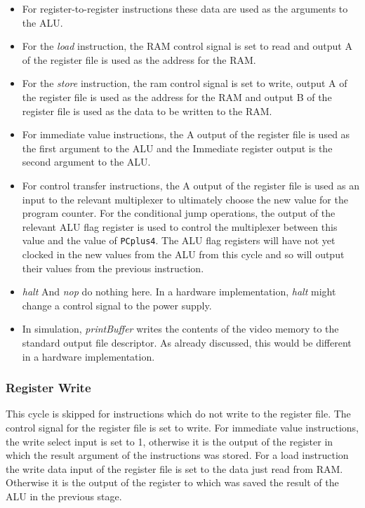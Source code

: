 \documentclass[11pt,a4paper]{IEEEtran}
\begin{document}
				\begin{itemize}
					\item For register-to-register instructions these data are used as the arguments to the ALU.
					\item For the \textit{load} instruction, the RAM control signal is set to read and output A of the register file is used as the address for the RAM.
					\item For the \textit{store} instruction, the ram control signal is set to write, output A of the register file is used as the address for the RAM and output B of the register file is used as the data to be written to the RAM.
					\item For immediate value instructions, the A output of the register file is used as the first argument to the ALU and the Immediate register output is the second argument to the ALU. 
					\item For control transfer instructions, the A output of the register file is used as an input to the relevant multiplexer to ultimately choose the new value for the program counter. For the conditional jump operations, the output of the relevant ALU flag register is used to control the multiplexer between this value and the value of \texttt{PCplus4}. The ALU flag registers will have not yet clocked in the new values from the ALU from this cycle and so will output their values from the previous instruction. 
					\item \textit{halt} And \textit{nop} do nothing here. In a hardware implementation, \textit{halt} might change a control signal to the power supply. 
					\item In simulation, \textit{printBuffer} writes the contents of the video memory to the standard output file descriptor. As already discussed, this would be different in a hardware implementation.
				\end{itemize}								
				 
			\subsubsection{Register Write}
				This cycle is skipped for instructions which do not write to the register file. The control signal for the register file is set to write. For immediate value instructions, the write select input is set to 1, otherwise it is the output of the register in which the result argument of the instructions was stored. For a load instruction the write data input of the register file is set to the data just read from RAM. Otherwise it is the output of the register to which was saved the result of the ALU in the previous stage.			
			
\end{document}
